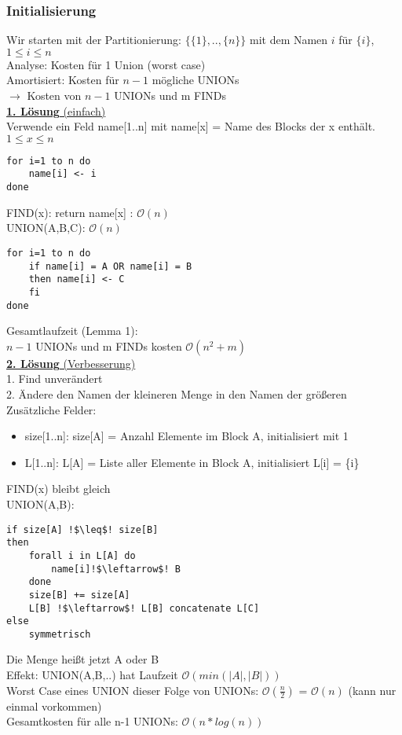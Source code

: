 \documentclass[a4paper]{article}
\newcommand{\oh}[1]{$\mathcal{O}(#1)$}
\begin{document}
\subsubsection*{Initialisierung}
Wir starten mit der Partitionierung: $\{\{1\},..,\{n\}\}$ mit dem Namen $i$ für $\{i\}$,$1\leq i \leq n$\\
Analyse: Kosten für 1 Union (worst case)\\
Amortisiert: Kosten für $n-1$ mögliche UNIONs\\
$\rightarrow$ Kosten von $n-1$ UNIONs und m FINDs\\
\underline{\textbf{1. Lösung} (einfach)}\\
Verwende ein Feld name[1..n] mit name[x] = Name des Blocks der x enthält. $1\leq x \leq n$\\
\begin{lstlisting}
for i=1 to n do
	name[i] <- i
done
\end{lstlisting}
FIND(x): return name[x] : \oh{n}\\
UNION(A,B,C): \oh{n}
\begin{lstlisting}
for i=1 to n do
	if name[i] = A OR name[i] = B
	then name[i] <- C
	fi
done
\end{lstlisting}
Gesamtlaufzeit (Lemma 1):\\
$n-1$ UNIONs und m FINDs kosten \oh{n^2+m}\\
\underline{\textbf{2. Lösung} (Verbesserung)}\\
1. Find unverändert\\
2. Ändere den Namen der kleineren Menge in den Namen der größeren\\
Zusätzliche Felder:
\begin{itemize}
\item size[1..n]: size[A] = Anzahl Elemente im Block A, initialisiert mit 1
\item L[1..n]: L[A] = Liste aller Elemente in Block A, initialisiert L[i] = \{i\}
\end{itemize}
FIND(x) bleibt gleich\\
UNION(A,B):
\begin{lstlisting}[escapechar=!]
if size[A] !$\leq$! size[B]
then
	forall i in L[A] do
		name[i]!$\leftarrow$! B
	done
	size[B] += size[A]
	L[B] !$\leftarrow$! L[B] concatenate L[C]
else
	symmetrisch
\end{lstlisting}
Die Menge heißt jetzt A oder B\\
Effekt: UNION(A,B,..) hat Laufzeit \oh{min(|A|,|B|)}\\
Worst Case eines UNION dieser Folge von UNIONs: \oh{\frac{n}{2}} = \oh{n} (kann nur einmal vorkommen)\\
Gesamtkosten für alle n-1 UNIONs: \oh{n*log(n)}
\end{document}
